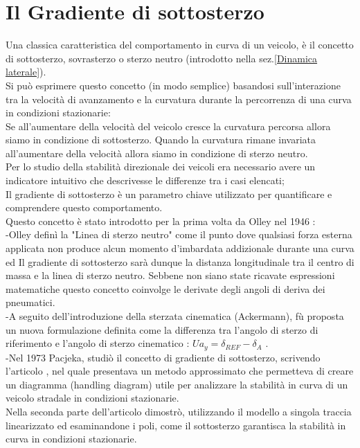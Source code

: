 \chapter{Il Gradiente di sottosterzo}
\label{cha:cap2}
Una classica caratteristica del comportamento in curva di un veicolo, è il concetto di
sottosterzo, sovrasterzo o sterzo neutro (introdotto nella sez.\ref{Dinamica laterale}).\\
Si può esprimere questo concetto (in modo semplice) basandosi sull’interazione tra la velocità di avanzamento e la curvatura durante la percorrenza di una curva in condizioni stazionarie:\\
Se all’aumentare della velocità del veicolo cresce la curvatura percorsa allora 
siamo in condizione di sottosterzo.
Quando la curvatura rimane invariata all’aumentare della velocità allora siamo in
condizione di sterzo neutro.\\
Per lo studio della stabilità direzionale dei veicoli era necessario avere un indicatore intuitivo che descrivesse le differenze tra i casi elencati;\\ 
Il gradiente di sottosterzo è un parametro chiave utilizzato per quantificare e comprendere questo comportamento.\\
Questo concetto è stato introdotto per la prima volta da Olley nel 1946 \cite{Olley1946RoadMO}:\\
-Olley definì la "Linea di sterzo neutro" come il punto dove qualsiasi forza esterna applicata non produce alcun momento d'imbardata addizionale durante una curva ed Il gradiente di sottosterzo sarà dunque la distanza longitudinale tra il centro di massa e la linea di sterzo neutro.
Sebbene non siano state ricavate espressioni matematiche questo concetto coinvolge le derivate degli angoli di deriva dei pneumatici.\\
-A seguito dell'introduzione della sterzata cinematica (Ackermann), fù proposta un nuova formulazione definita come la differenza tra l'angolo di sterzo di riferimento e l'angolo di sterzo cinematico : $Ua_y = \delta_{REF} - \delta_A$ \cite{society1965vehicle}.\\
-Nel 1973 Pacjeka, studiò il concetto di gradiente di sottosterzo, scrivendo l'articolo \cite{doi:10.1080/00423117308968439}, nel quale presentava un metodo approssimato che permetteva di
creare un diagramma (handling diagram) utile per analizzare la stabilità in curva di un veicolo 
stradale in condizioni stazionarie.\\
Nella seconda parte dell'articolo \cite{doi:10.1080/00423117308968440} dimostrò, utilizzando il modello a singola traccia linearizzato ed esaminandone i poli, come il sottosterzo garantisca la stabilità in curva in condizioni stazionarie.\\
